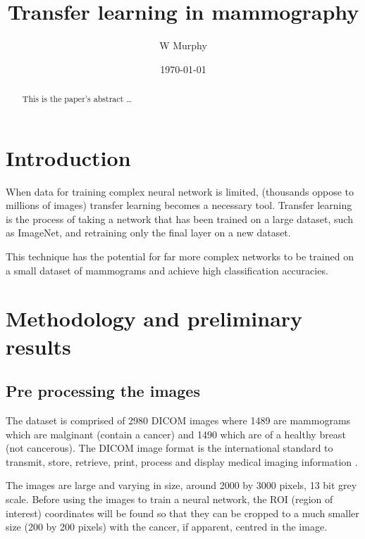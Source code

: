 \documentclass[12pt]{article}
\title{Transfer learning in mammography}
\author{
W Murphy
}
\date{\today}
\begin{document}
\maketitle

\begin{abstract}
This is the paper's abstract \ldots
\end{abstract}

\section{Introduction}
When data for training complex neural network is limited, (thousands oppose to millions of images) transfer learning becomes a necessary tool.  Transfer learning is the process of taking a network that has been trained on a large dataset, such as ImageNet, and retraining only the final layer on a new dataset.  

This technique has the potential for far more complex networks to be trained on a small dataset of mammograms and achieve high classification accuracies. 


\section{Methodology and preliminary results}
\subsection{Pre processing the images}
The dataset is comprised of 2980 DICOM images where 1489 are mammograms which are malginant (contain a cancer) and 1490 which are of a healthy breast (not cancerous).  The DICOM image format is the international standard to transmit, store, retrieve, print, process and display medical imaging information \autocite{dicom}.

The images are large and varying in size, around 2000 by 3000 pixels, 13 bit grey scale.  Before using the images to train a neural network, the ROI (region of interest) coordinates will be found so that they can be cropped to a much smaller size (200 by 200 pixels) with the cancer, if apparent, centred in the image.  
\end{document}
